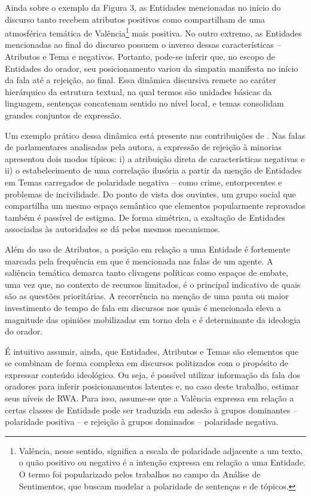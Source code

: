 \documentclass[
12pt,				%
openright,			%
twoside,			%
a4paper,			%
english,			%
french,				%
spanish,			%
brazil				%
]{abntex2}
\begin{document}
Ainda sobre o exemplo da Figura 3, as Entidades mencionadas no início do discurso tanto recebem atributos positivos como compartilham de uma atmosférica temática de Valência\footnote{Valência, nesse sentido, significa a escala de polaridade adjacente a um texto, o quão positivo ou negativo é a intenção expressa em relação a uma Entidade. O termo foi popularizado pelos trabalhos no campo da Análise de Sentimentos, que buscam modelar a polaridade de sentenças e de tópicos.} mais positiva. No outro extremo, as Entidades mencionadas ao final do discurso possuem o inverso dessas características -- Atributos e Tema e negativos. Portanto, pode-se inferir que, no escopo de Entidades do orador, seu posicionamento variou da simpatia manifesta no início da fala até a rejeição, ao final. Essa dinâmica discursiva remete ao caráter hierárquico da estrutura textual, na qual termos são unidades básicas da linguagem, sentenças concatenam sentido no nível local, e temas consolidam grandes conjuntos de expressão.    

Um exemplo prático dessa dinâmica está presente nas contribuições de . Nas falas de parlamentares analisadas pela autora, a expressão de rejeição à minorias apresentou dois modos típicos: i) a atribuição direta de características negativas e ii) o estabelecimento de uma correlação ilusória a partir da menção de Entidades em Temas carregados de polaridade negativa -- como crime, entorpecentes e problemas de incivilidade. Do ponto de vista dos ouvintes, um grupo social que compartilha um mesmo espaço semântico que elementos popularmente reprovados também é passível de estigma. De forma simétrica, a exaltação de Entidades associadas às autoridades se dá pelos mesmos mecanismos.

Além do uso de Atributos, a posição em relação a uma Entidade é fortemente marcada pela frequência em que é mencionada nas falas de um agente. A saliência temática demarca tanto clivagens políticas como espaços de embate, uma vez que, no contexto de recursos limitados, é o principal indicativo de quais são as questões prioritárias. A recorrência na menção de uma pauta ou maior investimento de tempo de fala em discursos nos quais é mencionada eleva a magnitude das opiniões mobilizadas em torno dela e é determinante da ideologia do orador.

É intuitivo assumir, ainda, que Entidades, Atributos e Temas são elementos que se combinam de forma complexa em discursos politizados com o propósito de expressar conteúdo ideológico. Ou seja, é possível utilizar informação da fala dos oradores para inferir posicionamentos latentes e, no caso deste trabalho, estimar seus níveis de RWA. Para isso, assume-se que a Valência expressa em relação a certas classes de Entidade pode ser traduzida em adesão à grupos dominantes -- polaridade positiva -- e rejeição à grupos dominados -- polaridade negativa.
\end{document}
